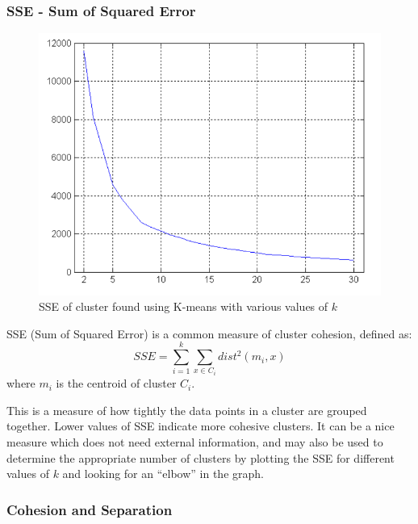 \subsubsection{SSE - Sum of Squared Error}
\begin{paracol}{2}
   
   
   \begin{figure}[htbp]
      \centering
      \includegraphics{images/05/sse.png}
      \caption{SSE of cluster found using K-means with various values of $k$}
      \label{fig:05/sse}
   \end{figure}
   
   \switchcolumn
   
   SSE (Sum of Squared Error) is a common measure of cluster cohesion, defined as:
   \[SSE = \sum_{i=1}^{k} \sum_{x \in C_i} dist^2(m_i, x)\]
   where $m_i$ is the centroid of cluster $C_i$.
   
   This is a measure of how tightly the data points in a cluster are grouped together. Lower values of SSE indicate more cohesive clusters.
   It can be a nice measure which does not need external information, and may also be used to determine the appropriate number of clusters by plotting the SSE for different values of $k$ and looking for an ``elbow'' in the graph.
\end{paracol}

\subsubsection{Cohesion and Separation}

